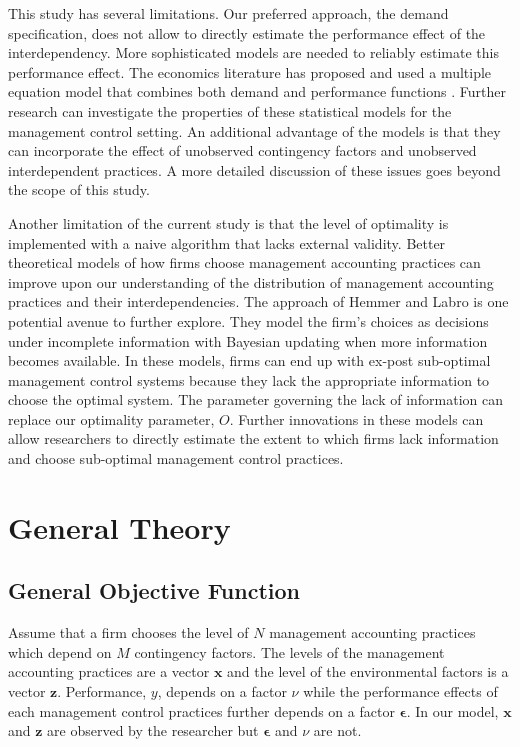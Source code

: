 \documentclass[12pt]{article}
\begin{document}
This study has several limitations.  Our preferred approach, the demand specification, does not allow to directly estimate the performance effect of the interdependency. More sophisticated models are needed to reliably estimate this performance effect. The economics literature has proposed and used a multiple equation model that combines both demand and performance functions \citep{athey_empirical_1998, gentzkow_valuing_2007, kretschmer_competitive_2012, miravete_innovation_2006}. Further research can investigate the properties of these statistical models for the management control setting. An additional advantage of the models is that they can incorporate the effect of unobserved contingency factors and unobserved interdependent practices. A more detailed discussion of these issues goes beyond the scope of this study.

Another limitation of the current study is that the level of optimality is implemented with a naive algorithm that lacks external validity. Better theoretical models of how firms choose management accounting practices can improve upon our understanding of the distribution of management accounting practices and their interdependencies. The approach of Hemmer and Labro \citeyearpar{hemmer_management_2019} is one potential avenue to further explore. They model the firm's choices as decisions under incomplete information with Bayesian updating when more information becomes available. In these models, firms can end up with ex-post sub-optimal management control systems because they lack the appropriate information to choose the optimal system. The parameter governing the lack of information can replace our optimality parameter, \(O\). Further innovations in these models can allow researchers to directly estimate the extent to which firms lack information and choose sub-optimal management control practices.

\pagebreak
 
\appendix
\renewcommand{\theequation}{A.\arabic{equation}}
\setcounter{equation}{0}

\section{General Theory}\label{appendix-general}
\subsection{General Objective Function}
 
Assume that a firm chooses the level of $N$ management accounting practices which depend on $M$ contingency factors. The levels of the management accounting practices are a vector $\mathbf{x}$ and the level of the environmental factors is a vector $\mathbf{z}$. Performance, $y$, depends on a factor $\nu$ while the performance effects of each management control practices further depends on a factor $\mathbf{\epsilon}$. In our model, $\mathbf{x}$ and $\mathbf{z}$ are observed by the researcher but $\mathbf{\epsilon}$ and $\nu$ are not. 
 
\end{document}

